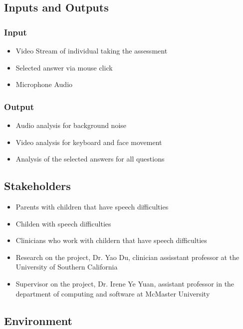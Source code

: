 \documentclass{article}
\begin{document}
\subsection{Inputs and Outputs}
\subsubsection{Input}
\begin{itemize}
\item Video Stream of individual taking the assessment
\item Selected answer via mouse click
\item Microphone Audio 
\end{itemize}
\subsubsection{Output}
\begin{itemize}
\item Audio analysis for background noise 
\item Video analysis for keyboard and face movement
\item Analysis of the selected answers for all questions
\end{itemize}

\subsection{Stakeholders}
\begin{itemize}
    \item Parents with children that have speech difficulties
    \item Childen with speech difficulties
    \item Clinicians who work with childern that have speech difficulties
    \item Research on the project, Dr. Yao Du, clinician assisstant professor at the University of Southern California
    \item Supervisor on the project, Dr. Irene Ye Yuan, assistant professor in the department of computing and software at McMaster University
\end{itemize}

\subsection{Environment}
\end{document}
